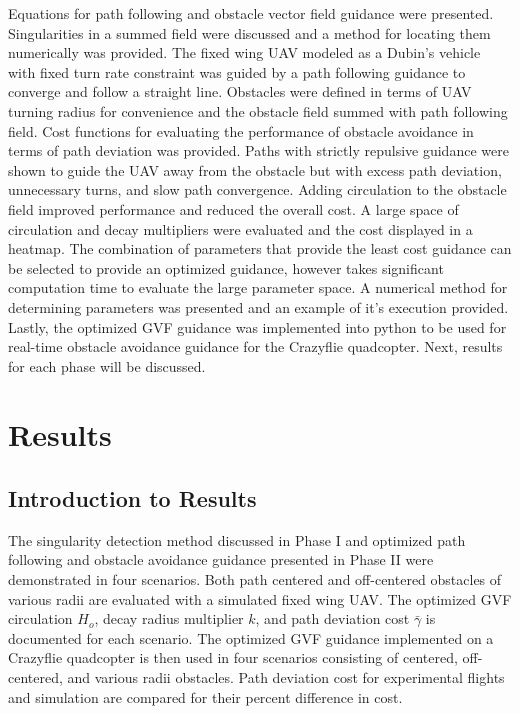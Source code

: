 \documentclass[numbered,pdftex]{ohio-etd}
\begin{document}
Equations for path following and obstacle vector field guidance were presented. Singularities in a summed field were discussed and a method for locating them numerically was provided. The fixed wing UAV modeled as a Dubin's vehicle with fixed turn rate constraint was guided by a path following guidance to converge and follow a straight line. Obstacles were defined in terms of UAV turning radius for convenience and the obstacle field summed with path following field. Cost functions for evaluating the performance of obstacle avoidance in terms of path deviation was provided. Paths with strictly repulsive guidance were shown to guide the UAV away from the obstacle but with excess path deviation, unnecessary turns, and slow path convergence. Adding circulation to the obstacle field improved performance and reduced the overall cost. A large space of circulation and decay multipliers were evaluated and the cost displayed in a heatmap. The combination of parameters that provide the least cost guidance can be selected to provide an optimized guidance, however takes significant computation time to evaluate the large parameter space. A numerical method for determining parameters was presented and an example of it's execution provided. Lastly, the optimized GVF guidance was implemented into python to be used for real-time obstacle avoidance guidance for the Crazyflie quadcopter. Next, results for each phase will be discussed. 


\chapter{Results}
\section{Introduction to Results}

The singularity detection method discussed in Phase I and optimized path following and obstacle avoidance guidance presented in Phase II were demonstrated in four scenarios. Both path centered and off-centered obstacles of various radii are evaluated with a simulated fixed wing UAV. The optimized GVF circulation $H_o$, decay radius multiplier $k$, and path deviation cost $\bar{\gamma}$ is documented for each scenario. The optimized GVF guidance implemented on a Crazyflie quadcopter is then used in four scenarios consisting of centered, off-centered, and various radii obstacles. Path deviation cost for experimental flights and simulation are compared for their percent difference in cost.
\end{document}
